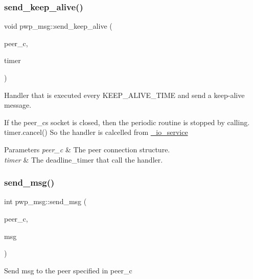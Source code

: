 \subsubsection{\texorpdfstring{send\+\_\+keep\+\_\+alive()}{send\_keep\_alive()}}
{\footnotesize\ttfamily void pwp\+\_\+msg\+::send\+\_\+keep\+\_\+alive (\begin{DoxyParamCaption}\item[{const \hyperlink{structpwp_1_1peer__connection}{pwp\+::peer\+\_\+connection} \&}]{peer\+\_\+c,  }\item[{boost\+::asio\+::deadline\+\_\+timer \&}]{timer }\end{DoxyParamCaption})}

Handler that is executed every K\+E\+E\+P\+\_\+\+A\+L\+I\+V\+E\+\_\+\+T\+I\+ME and send a keep-\/alive message.

If the peer\+\_\+c\textquotesingle{}s socket is closed, then the periodic routine is stopped by calling.~\newline
 {\ttfamily timer.\+cancel()} So the handler is calcelled from \hyperlink{pwp_8hpp_a7efe93eb3d4e0f0c9ab96fa5ae443fcd}{\+\_\+io\+\_\+service}


\begin{DoxyParams}{Parameters}
{\em peer\+\_\+c} & The peer connection structure. \\
\hline
{\em timer} & The deadline\+\_\+timer that call the handler. \\
\hline
\end{DoxyParams}
\mbox{\label{namespacepwp__msg_aca807c6281879abef952f8feecccb6e8}} 
\subsubsection{\texorpdfstring{send\+\_\+msg()}{send\_msg()}}
{\footnotesize\ttfamily int pwp\+\_\+msg\+::send\+\_\+msg (\begin{DoxyParamCaption}\item[{\hyperlink{structpwp_1_1peer__connection}{pwp\+::peer\+\_\+connection} \&}]{peer\+\_\+c,  }\item[{std\+::vector$<$ uint8\+\_\+t $>$}]{msg }\end{DoxyParamCaption})}



Send {\ttfamily msg} to the peer specified in {\ttfamily peer\+\_\+c} 

